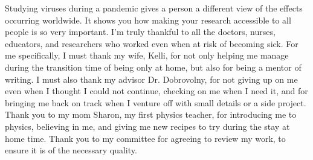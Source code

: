 Studying viruses during a pandemic gives a person a different view of the effects occurring worldwide. It shows you how making your research accessible to all people is so very important. I'm truly thankful to all the doctors, nurses, educators, and researchers who worked even when at risk of becoming sick. For me specifically, I must thank my wife, Kelli, for not only helping me manage during the transition time of being only at home, but also for being a mentor of writing. I must also thank my advisor Dr. Dobrovolny, for not giving up on me even when I thought I could not continue, checking on me when I need it, and for bringing me back on track when I venture off with small details or a side project. Thank you to my mom Sharon, my first physics teacher, for introducing me to physics, believing in me, and giving me new recipes to try during the stay at home time. Thank you to my committee for agreeing to review my work, to ensure it is of the necessary quality.
